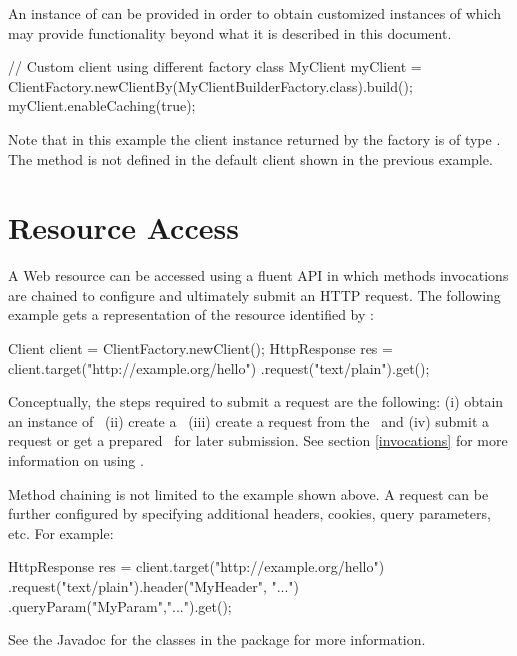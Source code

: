 An instance of  can be provided in order to obtain customized instances of  which may provide functionality beyond what it is described in this document.  

\begin{listing}{1}
// Custom client using different factory class
MyClient myClient = 
    ClientFactory.newClientBy(MyClientBuilderFactory.class).build();
myClient.enableCaching(true);
\end{listing}

Note that in this example the client instance returned by the factory is of type . The method  is not defined in the default client shown in the previous example.

\section{Resource Access}
\label{resource_access}

A Web resource can be accessed using a fluent API in which methods invocations are chained to configure and ultimately submit an HTTP request. The following example gets a  representation of the resource identified by :

\begin{listing}{1}
Client client = ClientFactory.newClient();
HttpResponse res = client.target("http://example.org/hello")
    .request("text/plain").get();
\end{listing}

Conceptually, the steps required to submit a request are the following: (i) obtain an instance of \Client\ (ii) create a \Target\ (iii) create a request from the \Target\ and (iv) submit a request or get a prepared \Invocation\ for later submission. See section \ref{invocations} for more information on using \Invocation.

Method chaining is not limited to the example shown above. A request can be further configured by specifying additional headers, cookies, query parameters, etc. For example:

\begin{listing}{1}
HttpResponse res = client.target("http://example.org/hello")
    .request("text/plain").header("MyHeader", "...")
    .queryParam("MyParam","...").get();
\end{listing}

See the Javadoc for the classes in the  package for more information.

